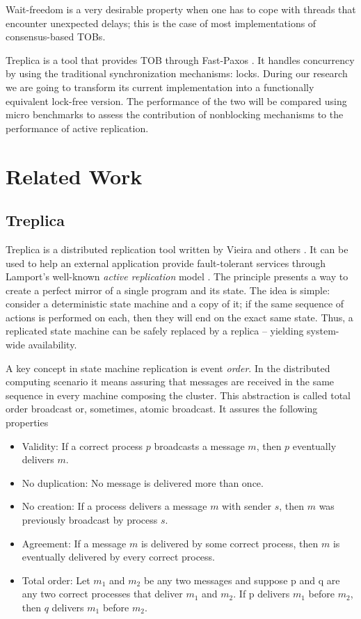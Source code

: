 \documentclass[12pt]{article}
\begin{document}
Wait-freedom is a very  desirable property when one has to cope with threads
that encounter unexpected delays; this  is the case
of  most  implementations of  consensus-based  TOBs.

Treplica \cite{vieira2008} is a tool that provides TOB through Fast-Paxos
\cite{Lamport2006}. It handles concurrency by using the traditional
synchronization mechanisms: locks. During our research we are going to transform
its current implementation  into a functionally equivalent lock-free version.
The  performance of the two will be compared using micro benchmarks to assess
the contribution  of nonblocking mechanisms to the  performance of active
replication.


\section{Related Work}
\label{sec:related}
\subsection{Treplica}
Treplica is a distributed replication tool written by Vieira and others \cite{vieira2008}. It can be used to help an external application provide fault-tolerant services through Lamport's well-known \textit{active replication} model \cite{Lamport1978}. The principle presents a way to create a perfect mirror of a single program and its state. The idea is simple: consider a deterministic state machine and a copy of it; if the same sequence of actions is performed on each, then they will end on the exact same state. Thus, a replicated state machine can be safely replaced by a replica -- yielding system-wide availability.

A key concept in state machine replication is event \textit{order}. In the distributed computing scenario it means assuring that messages are received in the same sequence in every machine composing the cluster. This abstraction is called total order broadcast or, sometimes, atomic broadcast. It assures the following properties \cite{cachin2011}

\begin{itemize}
\item Validity: If a correct process $p$ broadcasts a message $m$, then $p$ eventually delivers $m$.
\item No duplication: No message is delivered more than once.
\item No creation: If a process delivers a message $m$ with sender $s$, then $m$ was previously broadcast by process $s$.
\item Agreement: If a message $m$ is delivered by some correct process, then $m$ is eventually delivered by every correct process.
\item Total order: Let $m_1$ and $m_2$ be any two messages and suppose p and q are any two correct processes that deliver $m_1$ and $m_2$. If p delivers $m_1$ before $m_2$, then $q$ delivers $m_1$ before $m_2$.
\end{itemize}
\end{document}
